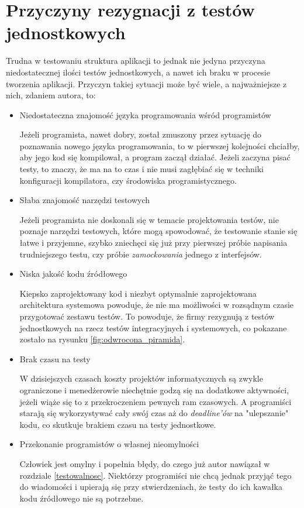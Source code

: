 \section{Przyczyny rezygnacji z testów jednostkowych}
\label{testy_jednostkowe_brak}
Trudna w testowaniu struktura aplikacji to jednak nie jedyna przyczyna niedostatecznej ilości testów jednostkowych, a nawet ich braku w procesie tworzenia aplikacji. Przyczyn takiej sytuacji może być wiele, a najważniejsze z nich, zdaniem autora, to:
\begin{itemize}
\item
Niedostateczna znajomość języka programowania wśród programistów

Jeżeli programista, nawet dobry, został zmuszony przez sytuację do poznawania nowego języka programowania, to w pierwszej kolejności chciałby, aby jego kod się kompilował, a program zaczął działać. Jeżeli zaczyna pisać testy, to znaczy, że ma na to czas i nie musi zagłębiać się w techniki konfiguracji kompilatora, czy środowiska programistycznego. 

\item
Słaba znajomość narzędzi testowych

Jeżeli programista nie doskonali się w temacie projektowania testów, nie poznaje narzędzi testowych, które mogą spowodować, że testowanie stanie się łatwe i przyjemne, szybko zniechęci się już przy pierwszej próbie napisania trudniejszego testu, czy próbie \textit{zamockowania} jednego z interfejsów.

\item
Niska jakość kodu źródłowego

Kiepsko zaprojektowany kod i niezbyt optymalnie zaprojektowana architektura systemowa powoduje, że nie ma możliwości w rozsądnym czasie przygotować zestawu testów. To powoduje, że firmy rezygnują z  testów jednostkowych na rzecz testów integracyjnych i systemowych, co pokazane zostało na rysunku \ref{fig:odwrocona_piramida}.

\item
Brak czasu na testy

W dzisiejszych czasach koszty projektów informatycznych są zwykle ograniczone i menedżerowie niechętnie godzą się na dodatkowe aktywności, jeżeli wiąże się to z przekroczeniem pewnych ram czasowych. A programiści starają się wykorzystywać cały swój czas aż do \textit{deadline'ów} na "ulepszanie" kodu, co skutkuje brakiem czasu na testy jednostkowe.

\item
Przekonanie programistów o własnej nieomylności

Człowiek jest omylny i popełnia błędy, do czego już autor nawiązał w rozdziale \ref{testowalnosc}. Niektórzy programiści nie chcą jednak przyjąć tego do wiadomości i upierają się przy stwierdzeniach, że testy do ich kawałka kodu źródłowego nie są potrzebne.
\end{itemize}

